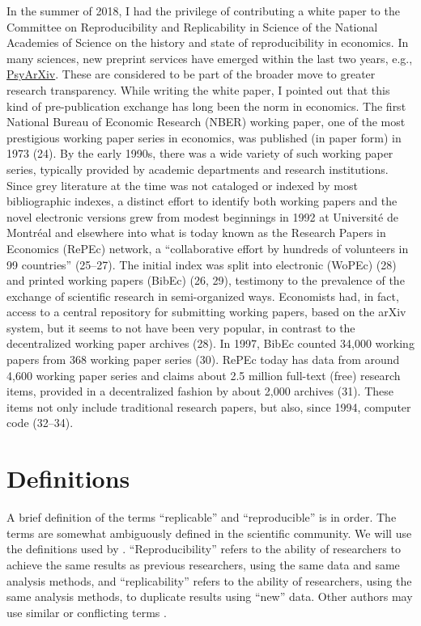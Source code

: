 \documentclass[AEJ]{AEA}
\begin{document}
\begin{cornerbox}
In the summer of 2018, I had the privilege of contributing a white paper to the Committee on Reproducibility and Replicability in Science of the National Academies of Science on the history and state of reproducibility in economics. In many sciences, new preprint services have emerged within the last two years, e.g., \href{https://psyarxiv.com/}{PsyArXiv}. These are considered to be part of the broader move to greater research transparency. While writing the white paper, I pointed out that this kind of pre-publication exchange has long been the norm in economics. The first National Bureau of Economic Research (NBER) working paper, one of the most prestigious working paper series in economics, was published (in paper form) in 1973 (24). By the early 1990s, there was a wide variety of such working paper series, typically provided by academic departments and research institutions. Since grey literature at the time was not cataloged or indexed by most bibliographic indexes, a distinct effort to identify both working papers and the novel electronic versions grew from modest beginnings in 1992 at Université de Montréal and elsewhere into what is today known as the Research Papers in Economics (RePEc) network, a “collaborative effort by hundreds of volunteers in 99 countries” (25–27). The initial index was split into electronic (WoPEc) (28) and printed working papers (BibEc) (26, 29), testimony to the prevalence of the exchange of scientific research in semi-organized ways. Economists had, in fact, access to a central repository for submitting working papers, based on the arXiv system, but it seems to not have been very popular, in contrast to the decentralized working paper archives (28). In 1997, BibEc counted 34,000 working papers from 368 working paper series (30). RePEc today has data from around 4,600 working paper series and claims about 2.5 million full-text (free) research items, provided in a decentralized fashion by about 2,000 archives (31). These items not only include traditional research papers, but also, since 1994, computer code (32–34). 
\end{cornerbox}

\section{Definitions}
A brief definition of the terms ``replicable'' and ``reproducible'' is in order. The terms are somewhat ambiguously defined in the scientific community. We will use the definitions used by \cite{Bollen2015-vb}. ``Reproducibility''  refers to the ability of researchers to achieve the same results as previous researchers, using the same data and same analysis methods, and ``replicability''  refers to the ability of researchers, using the same analysis methods, to duplicate results using ``new'' data. Other authors may use similar or conflicting terms \citep{Clemens2017-zj}. 
\end{document}
